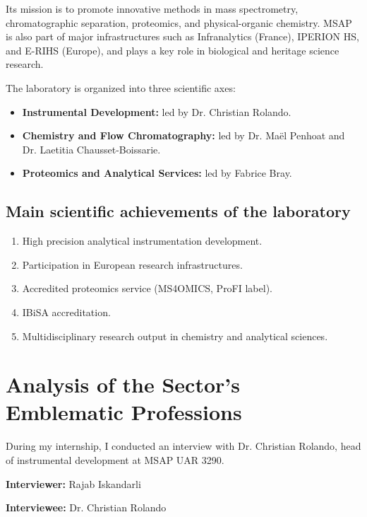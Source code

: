 \documentclass[12pt,a4paper]{report}
\begin{document}
Its mission is to promote innovative methods in mass spectrometry, chromatographic separation, proteomics, and physical-organic chemistry. MSAP is also part of major infrastructures such as Infranalytics (France), IPERION HS, and E-RIHS (Europe), and plays a key role in biological and heritage science research.

The laboratory is organized into three scientific axes:

\begin{itemize}
  \item \textbf{Instrumental Development:} led by Dr. Christian Rolando.
  \item \textbf{Chemistry and Flow Chromatography:} led by Dr. Maël Penhoat and Dr. Laetitia Chausset-Boissarie.
  \item \textbf{Proteomics and Analytical Services:} led by Fabrice Bray.
\end{itemize}

\subsection{Main scientific achievements of the laboratory}

\begin{enumerate}
  \item High precision analytical instrumentation development.
  \item Participation in European research infrastructures.
  \item Accredited proteomics service (MS4OMICS, ProFI label).
  \item IBiSA accreditation.
  \item Multidisciplinary research output in chemistry and analytical sciences.
\end{enumerate}

\section{Analysis of the Sector’s Emblematic Professions}

During my internship, I conducted an interview with Dr. Christian Rolando, head of instrumental development at MSAP UAR 3290.

\textbf{Interviewer:} Rajab Iskandarli

\textbf{Interviewee:} Dr. Christian Rolando

\bigskip
\end{document}
